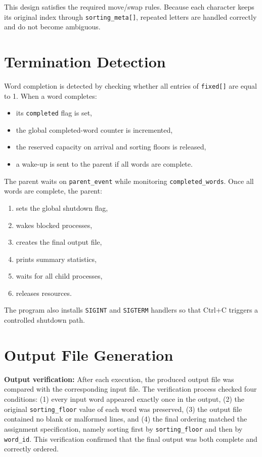 \documentclass[12pt,a4paper]{article}
\begin{document}
This design satisfies the required move/swap rules. Because each character keeps its original index through \texttt{sorting\_meta[]}, repeated letters are handled correctly and do not become ambiguous.

\section{Termination Detection}

Word completion is detected by checking whether all entries of \texttt{fixed[]} are equal to 1. When a word completes:

\begin{itemize}[leftmargin=1.5em]
\item its \texttt{completed} flag is set,
\item the global completed-word counter is incremented,
\item the reserved capacity on arrival and sorting floors is released,
\item a wake-up is sent to the parent if all words are complete.
\end{itemize}

The parent waits on \texttt{parent\_event} while monitoring \texttt{completed\_words}. Once all words are complete, the parent:

\begin{enumerate}[leftmargin=1.5em]
\item sets the global shutdown flag,
\item wakes blocked processes,
\item creates the final output file,
\item prints summary statistics,
\item waits for all child processes,
\item releases resources.
\end{enumerate}

The program also installs \texttt{SIGINT} and \texttt{SIGTERM} handlers so that Ctrl+C triggers a controlled shutdown path.

\section{Output File Generation}

\textbf{Output verification:}
After each execution, the produced output file was compared with the corresponding input file. 
The verification process checked four conditions: 
(1) every input word appeared exactly once in the output, 
(2) the original \texttt{sorting\_floor} value of each word was preserved, 
(3) the output file contained no blank or malformed lines, and 
(4) the final ordering matched the assignment specification, namely sorting first by \texttt{sorting\_floor} and then by \texttt{word\_id}. 
This verification confirmed that the final output was both complete and correctly ordered.
\end{document}
